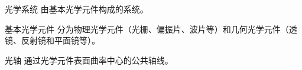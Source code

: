 
\begin{definition}{光学系统}
由基本光学元件构成的系统。
\end{definition}

\begin{definition}{基本光学元件}
分为物理光学元件（光栅、偏振片、波片等）和几何光学元件（透镜、反射镜和平面镜等）。
\end{definition}

\begin{definition}{光轴}
通过光学元件表面曲率中心的公共轴线。
\end{definition}
